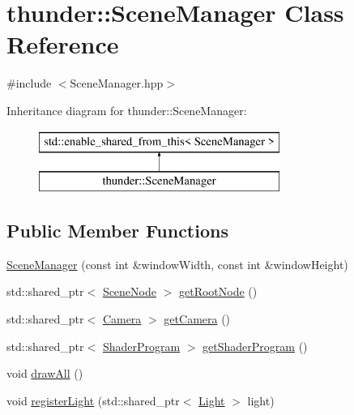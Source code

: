 \hypertarget{classthunder_1_1_scene_manager}{}\section{thunder\+:\+:Scene\+Manager Class Reference}
\label{classthunder_1_1_scene_manager}


{\ttfamily \#include $<$Scene\+Manager.\+hpp$>$}

Inheritance diagram for thunder\+:\+:Scene\+Manager\+:\begin{figure}[H]
\begin{center}
\leavevmode
\includegraphics[height=2.000000cm]{classthunder_1_1_scene_manager}
\end{center}
\end{figure}
\subsection*{Public Member Functions}
\begin{DoxyCompactItemize}
\item 
\mbox{\hyperlink{classthunder_1_1_scene_manager_a586dde422108d14fe061375e7454c144}{Scene\+Manager}} (const int \&window\+Width, const int \&window\+Height)
\item 
std\+::shared\+\_\+ptr$<$ \mbox{\hyperlink{classthunder_1_1_scene_node}{Scene\+Node}} $>$ \mbox{\hyperlink{classthunder_1_1_scene_manager_a3cc5d2cbec1cb527ef71895c1ced1081}{get\+Root\+Node}} ()
\item 
std\+::shared\+\_\+ptr$<$ \mbox{\hyperlink{classthunder_1_1_camera}{Camera}} $>$ \mbox{\hyperlink{classthunder_1_1_scene_manager_aa1e30f8dc889837b6ee4220641554a02}{get\+Camera}} ()
\item 
std\+::shared\+\_\+ptr$<$ \mbox{\hyperlink{classthunder_1_1_shader_program}{Shader\+Program}} $>$ \mbox{\hyperlink{classthunder_1_1_scene_manager_a02d3980415c0889e3625c7d508e48a73}{get\+Shader\+Program}} ()
\item 
void \mbox{\hyperlink{classthunder_1_1_scene_manager_a9d827a1795893be9092e8e3942fd1fc7}{draw\+All}} ()
\item 
void \mbox{\hyperlink{classthunder_1_1_scene_manager_a858ed05d43e2331bbf531ca6984c025f}{register\+Light}} (std\+::shared\+\_\+ptr$<$ \mbox{\hyperlink{classthunder_1_1_light}{Light}} $>$ light)
\end{DoxyCompactItemize}



